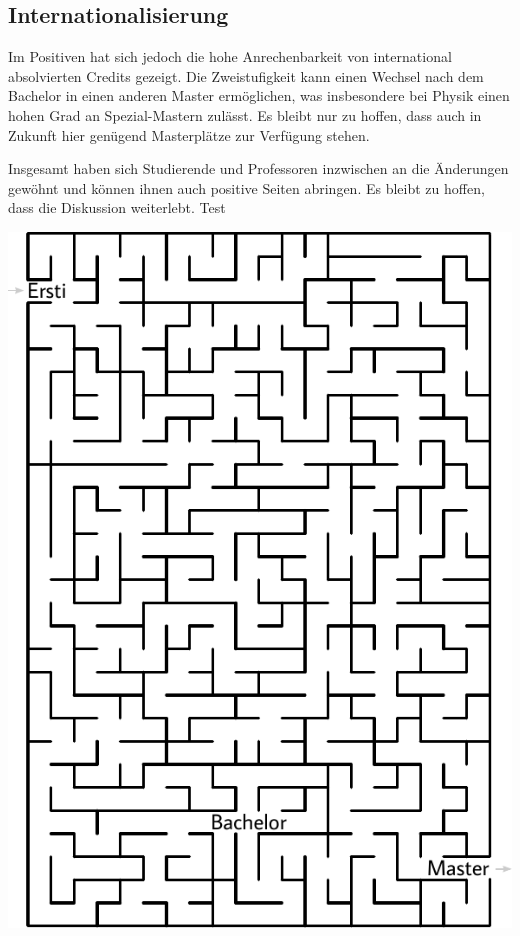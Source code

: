 \begin{multicols}{2}
\subsection{Internationalisierung}
Im Positiven hat sich jedoch die hohe Anrechenbarkeit von international absolvierten Credits gezeigt.
Die Zweistufigkeit kann einen Wechsel nach dem Bachelor in einen anderen Master ermöglichen, was insbesondere bei Physik einen hohen Grad an Spezial-Mastern zulässt.
Es bleibt nur zu hoffen, dass auch in Zukunft hier genügend Masterplätze zur Verfügung stehen.

Insgesamt haben sich Studierende und Professoren inzwischen an die Änderungen gewöhnt und können ihnen auch positive Seiten abringen.
Es bleibt zu hoffen, dass die Diskussion weiterlebt.
Test
\end{multicols}

\begin{center}
	\includegraphics[width=\textwidth, height=0.38\textheight]{res/bachelor_master_labyrinth.pdf}
\end{center}
